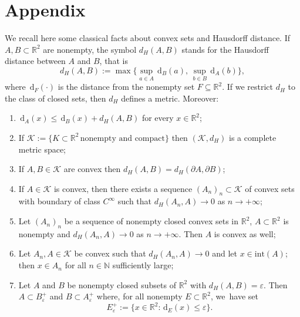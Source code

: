 \documentclass[11pt]{article}
\numberwithin{equation}{section}
\newcommand{\R}{\mathbb{R}}
\let\eps\varepsilon
\newcommand\compacts{\mathcal K}
\newcommand{\di}{\,\mathrm{d}}
\theoremstyle{definition}
\begin{document}
\appendix
\section*{Appendix}

We recall here some classical facts about convex sets and Hausdorff distance.
If~$A,B\subset\R^2$ are nonempty, the symbol $d_H(A,B)$
stands for the Hausdorff distance between $A$ and $B$, that is
\begin{equation*}
\textstyle
d_H(A,B):=\max\{\sup_{a\in A}
\di_B(a),\,\sup_{b\in B}\di_A(b)\},
\end{equation*}
where $\di_F(\cdot)$ is the distance from the nonempty set $F\subseteq \R^2$.
If we restrict $d_H$ to the class of closed sets,
then $d_H$ defines a metric. Moreover:
\begin{enumerate}[label=(H\arabic*),wide]
\item \label{H1}
$\di_A(x)\le \di_B(x)+d_H(A,B)$
for every $x\in\R^2$;
\item \label{H2}
If $\compacts:=\{K\subset\R^2\, \text{nonempty and compact}\}$
then $(\compacts,d_H)$
is a complete metric space;
\item \label{H3}
If $A, B \in \compacts$ are convex then $d_H(A,B)=d_H(\partial A,\partial B)$;
\item \label{H4}
If $A\in \compacts$ is convex,
then there exists a sequence $(A_n)_{n} \subset \compacts$
of convex sets with boundary of class $C^\infty$ such that
$d_H(A_n,A)\to0$ as $n\to +\infty$;
\item \label{H5} Let $(A_n)_{n}$
be a sequence of nonempty closed convex sets in $\R^2$, $A\subset\R^2$ is nonempty and $d_H(A_n,A)\to0$ as $n\to +\infty$. Then $A$ is convex as well;
\item\label{H6} Let $A_n,A\in\mathcal K$ be convex such that $d_H(A_n,A)\to0$ and let $x\in \mathrm{int}(A)$; then $x\in A_n$ for all $n\in \mathbb N$ sufficiently large;
\item \label{H7} Let $A$ and $B$ be nonempty closed subsets of $\R^2$ with $d_H(A,B)=\eps$. Then $A\subset B^+_\eps$ and $B\subset A^+_\eps$
where, for all nonempty $E\subset \R^2$, we~have set
\[
E^+_\eps:=\{x\in\R^2\colon \di_E(x)\le\eps\}.
\]
\end{enumerate}
\end{document}
